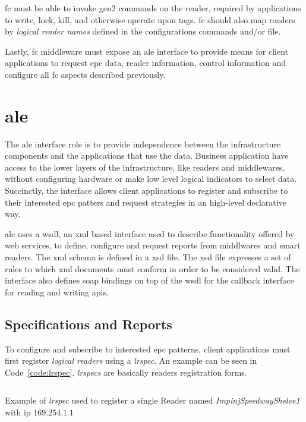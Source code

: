 \ac{fc} must be able to invoke \ac{gen2} commands on the reader, required by applications to write, lock, kill, and otherwise operate upon tags.
\ac{fc} should also map readers by \textit{logical reader names} defined in the configurations commands and/or file.

Lastly, \ac{fc} middleware must expose an \ac{ale} interface to provide means for client applications to request \ac{epc} data, reader information, control information and configure all \ac{fc} aspects described previously.

\section{\acf{ale}}

The \ac{ale} interface role is to provide independence  between the infrastructure components and the applications that use the data.
Business application have access to the lower layers of the infrastructure, like readers and middlewares, without configuring hardware or make low level logical indicators to select data.
Succinctly, the interface allows client applications to register and subscribe to their interested \ac{epc} patters and request strategies in an high-level declarative way.

\ac{ale} uses a \ac{wsdl}, an \ac{xml} based interface used to describe functionality offered by web services, to define, configure and request reports from middlwares and smart readers.
The \ac{xml} schema is defined in a \ac{xsd} file. The \ac{xsd} file expresses a set of rules to which \ac{xml} documents must conform in order to be considered valid. 
The interface also defines \ac{soap} bindings on top of the \ac{wsdl} for the callback interface for reading and writing \acp{api}.

\subsection{Specifications and Reports}

To configure and subscribe to interested \ac{epc} patterns, client applications must first register \textit{logical readers} using a \emph{\acf{lrspec}}. An example can be seen in Code~\ref{code:lrspec}. \emph{\acp{lrspec}} are basically readers registration forms.

\begin{listing}
    \inputminted[linenos, breaklines]{xml}{./code/sota/LRSpec.xml}
    \caption{Example of \emph{\acs{lrspec}} used to register a single Reader named \textit{ImpinjSpeedwayShelve1} with \ac{ip} $169.254.1.1$}
    \label{code:lrspec}
\end{listing}

